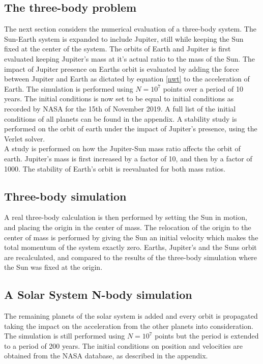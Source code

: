 \documentclass[%
reprint,nofootinbib,
amsmath,amssymb,
aps,
]{revtex4-1}
\begin{document}
\subsection*{The three-body problem} \noindent
The next section considers the numerical evaluation of a three-body system. The Sun-Earth system is expanded to include Jupiter, still while keeping the Sun fixed at the center of the system. The orbits of Earth and Jupiter is first evaluated keeping Jupiter's mass at it's actual ratio to the mass of the Sun. The impact of Jupiter presence on Earths orbit is evaluated by adding the force between Jupiter and Earth as dictated by equation \ref{nwt} to the acceleration of Earth. The simulation is performed using $N=10^7$ points over a period of 10 years. The initial conditions is now set to be equal to initial conditions as recorded by NASA for the 15th of November 2019. A full list of the initial conditions of all planets can be found in the appendix. A stability study is performed on the orbit of earth under the impact of Jupiter's presence, using the Verlet solver. \\ \indent 
A study is performed on how the Jupiter-Sun mass ratio affects the orbit of earth. Jupiter's mass is first increased by a factor of 10, and then by a factor of 1000. The stability of Earth's orbit is reevaluated for both mass ratios.
 
\subsection*{Three-body simulation} \noindent
A real three-body calculation is then performed by setting the Sun in motion, and placing the origin in the center of mass. The relocation of the origin to the center of mass is performed by giving the Sun an initial velocity which makes the total momentum of the system exactly zero. Earths, Jupiter's and the Suns orbit are recalculated, and compared to the results of the three-body simulation where the Sun was fixed at the origin.  \\ 

\newpage

\subsection*{A Solar System N-body simulation} \noindent 
The remaining planets of the solar system is added and every orbit is propagated taking the impact on the acceleration from the other planets into consideration. The simulation is still performed using $N=10^7$ points but the period is extended to a period of 200 years. The initial conditions on position and velocities are obtained from the NASA database, as described in the appendix. 
\end{document}
